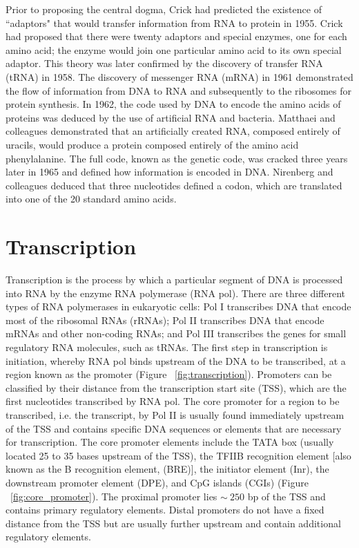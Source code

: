 Prior to proposing the central dogma, Crick had predicted the existence of ``adaptors" that would transfer information from RNA to protein in 1955\cite{cricktrna1955}. Crick had proposed that there were twenty adaptors and special enzymes, one for each amino acid; the enzyme would join one particular amino acid to its own special adaptor. This theory was later confirmed by the discovery of transfer RNA (tRNA) in 1958\cite{pmid13538965}. The discovery of messenger RNA (mRNA) in 1961 \cite{BRENNER1961} demonstrated the flow of information from DNA to RNA and subsequently to the ribosomes\cite{pmid14381428} for protein synthesis. In 1962, the code used by DNA to encode the amino acids of proteins was deduced  by the use of artificial RNA and bacteria\cite{pmid14471390}. Matthaei and colleagues demonstrated that an artificially created RNA, composed entirely of uracils, would produce a protein composed entirely of the amino acid phenylalanine. The full code, known as the genetic code, was cracked three years later in 1965\cite{pmid5330357} and defined how information is encoded in DNA. Nirenberg and colleagues deduced that three nucleotides defined a codon, which are translated into one of the 20 standard amino acids.

\section{Transcription}

Transcription is the process by which a particular segment of DNA is processed into RNA by the enzyme RNA polymerase (RNA pol). There are three different types of RNA polymerases in eukaryotic cells: Pol I transcribes DNA that encode most of the ribosomal RNAs (rRNAs); Pol II transcribes DNA that encode mRNAs and other non-coding RNAs; and Pol III transcribes the genes for small regulatory RNA molecules, such as tRNAs. The first step in transcription is initiation, whereby RNA pol binds upstream of the DNA to be transcribed, at a region known as the promoter (Figure ~\ref{fig:transcription}). Promoters can be classified by their distance from the transcription start site (TSS), which are the first nucleotides transcribed by RNA pol. The core promoter for a region to be transcribed, i.e. the transcript, by Pol II is usually found immediately upstream of the TSS and contains specific DNA sequences or elements that are necessary for transcription. The core promoter elements include the TATA box (usually located 25 to 35 bases upstream of the TSS), the TFIIB recognition element [also known as the B recognition element, (BRE)], the initiator element (Inr), the downstream promoter element (DPE), and CpG islands (CGIs) (Figure ~\ref{fig:core_promoter}). The proximal promoter lies $\sim~250$ bp of the TSS and contains primary regulatory elements. Distal promoters do not have a fixed distance from the TSS but are usually further upstream and contain additional regulatory elements.

